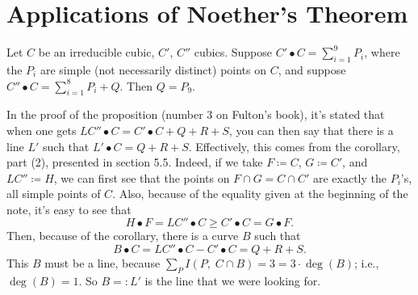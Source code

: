 \section{Applications of Noether's Theorem}

\begin{prop}
	Let $C$ be an irreducible cubic, $C'$, $C''$ cubics. Suppose $C' \bullet C = \sum_{i = 1}^{9} P_{i}$, where the $P_{i}$ are simple (not necessarily distinct) points on $C$, and suppose $C'' \bullet C = \sum_{i=1}^{8} P_{i} + Q$. Then $Q = P_{9}$.
\end{prop}

\begin{remark}
	In the proof of the proposition (number 3 on Fulton's book), it's stated that when one gets $LC'' \bullet C = C' \bullet C + Q + R + S$, you can then say that there is a line $L'$ such that $L' \bullet C = Q + R + S$. Effectively, this comes from the corollary, part (2), presented in section 5.5. Indeed, if we take $F \coloneq C$, $G \coloneq C'$, and $LC'' \coloneq H$, we can first see that the points on $F \cap G = C \cap C'$ are exactly the $P_{i}$'s, all simple points of $C$. Also, because of the equality given at the beginning of the note, it's easy to see that 
	\[ H \bullet F = LC'' \bullet C \geq C' \bullet C = G \bullet F. \]
	Then, because of the corollary, there is a curve $B$ such that 
	\[ B \bullet C = LC'' \bullet C - C' \bullet C = Q + R + S. \]
	This $B$ must be a line, because $\sum_{P} I(P,\; C \cap B) = 3 = 3 \cdot \deg(B)$; i.e., $\deg(B) = 1$. So $B =: L'$ is the line that we were looking for.
\end{remark}
